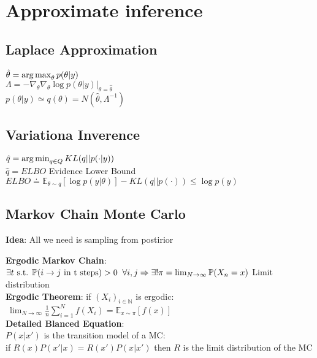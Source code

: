 
\section{Approximate inference}


\subsection{Laplace Approximation}
$\hat\theta=\operatorname*{arg\,max}_\theta p(\theta\vert y)$\\
$\Lambda = -\nabla_\theta \nabla_\theta \log{p(\theta\vert y)}\vert_{\theta = \hat\theta}$\\
$p(\theta\vert y)\simeq q(\theta)=N(\hat\theta,\Lambda^{-1})$


\subsection{Variationa Inverence}
$\hat q = \operatorname*{arg\,min}_{q \in Q} KL(q\vert\vert p(\cdot\vert y))$\\
$\hat q = ELBO$ Evidence Lower Bound\\
$ELBO \doteq \mathbb{E}_{\theta \sim q}\left[\log{p(y\vert\theta)}\right]-KL(q\vert\vert p(\cdot)) \leq \log{p(y)}$


\subsection{Markov Chain Monte Carlo}
\textbf{Idea}: All we need is sampling from postirior

\textbf{Ergodic Markov Chain}: \\
$\exists t \text{ s.t. } \mathbb{P}(i \to j \text{ in t steps})>0\;\; \forall i,j \Rightarrow\\
 \exists! \pi = \lim_{N\to \infty} \mathbb{P}(X_n=x)$ Limit distribution\\

 \textbf{Ergodic Theorem}: if $(X_i)_{i\in\mathbb{N}}$ is ergodic:\\
$\ \lim_{N\to \infty}\frac{1}{n}\sum_{i=1}^{N}f(X_i)=\mathbb{E}_{x\sim\pi}\left[f(x)\right]$\\

\textbf{Detailed Blanced Equation}:\\
$P(x\vert x')$ is the transition model of a MC:\\
if $R(x)P(x'\vert x) = R(x')P(x\vert x')$ then $R$ is the limit distribution of the MC \\

